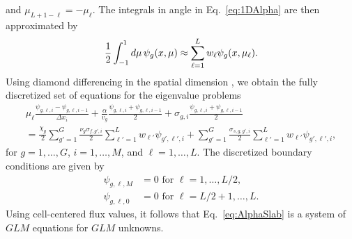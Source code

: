 and $\mu_{L+1-\ell} = - \mu_{\ell}$. The integrals in angle in Eq.~\ref{eq:1DAlpha} are then approximated by
\begin{equation*}
	\frac{1}{2} \int_{-1}^{1} \mathop{}\!d \mu \, \psi_{g}(x, \mu) \approx \sum_{\ell=1}^{L} w_{\ell} \psi_{g}(x, \mu_{\ell}).
\end{equation*}
Using diamond differencing in the spatial dimension \cite{lewis_computational_1984}, we obtain the fully discretized set of equations for the eigenvalue problems
\begin{multline}
	\mu_{\ell} \frac{ \psi_{g,\ell,i} - \psi_{g, \ell, i-1}}{\Delta x_{i}} + \frac{\alpha}{v_{g}} \frac{\psi_{g,\ell,i} + \psi_{g, \ell, i-1}}{2} + \sigma_{g,i} \frac{\psi_{g,\ell,i} + \psi_{g, \ell, i-1}}{2} \\ = \frac{\chi_{g}}{2} \sum_{g'=1}^{G} \frac{\nu_{g}\sigma_{f,g',i}}{2} \sum_{\ell' = 1}^{L} w_{\ell'} \psi_{g',\ell',i} + \sum_{g'=1}^{G} \frac{\sigma_{s,g,g',i}}{2} \sum_{\ell' = 1}^{L} w_{\ell'} \psi_{g',\ell',i},
\label{eq:AlphaSlab}
\end{multline}
for $g = 1, \dots, G$, $i = 1, \dots, M$, and $\ell = 1, \dots, L$. The discretized boundary conditions are given by
\begin{align*}
\psi_{g,\ell,M} &= 0 \text{ for } \ell = 1, \dots, L/2,  \\
\psi_{g,\ell,0} &= 0 \text{ for } \ell = L/2+1, \dots, L.
\end{align*}
Using cell-centered flux values, it follows that Eq.~\ref{eq:AlphaSlab} is a system of $GLM$ equations for $GLM$ unknowns. 


